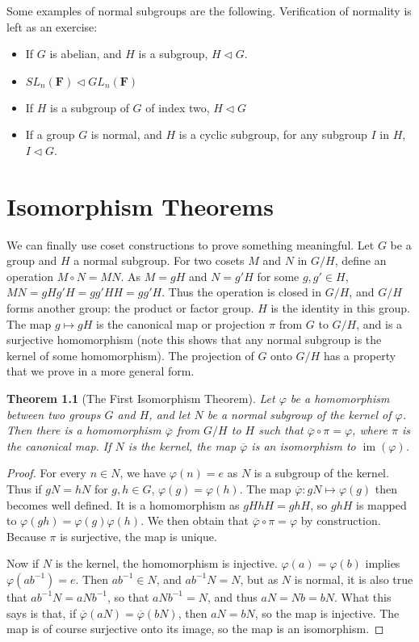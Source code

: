 \documentclass[12pt]{report}
\newtheorem{theorem}{Theorem}[section]
\DeclareMathOperator{\im}{im}
\begin{document}
Some examples of normal subgroups are the following. Verification of normality is left as an exercise:
\begin{itemize}
    \item If $G$ is abelian, and $H$ is a subgroup, $H \lhd G$.
    \item $SL_n(\mathbf{F}) \lhd GL_n(\mathbf{F})$
    \item If $H$ is a subgroup of $G$ of index two, $H \lhd G$
    \item If a group $G$ is normal, and $H$ is a cyclic subgroup, for any subgroup $I$ in $H$, $I \lhd G$.
\end{itemize}

\chapter{Isomorphism Theorems}

We can finally use coset constructions to prove something meaningful. Let $G$ be a group and $H$ a normal subgroup. For two cosets $M$ and $N$ in $G/H$, define an operation $M \circ N = MN$. As $M = gH$ and $N = g'H$ for some $g,g' \in H$, $MN = gHg'H = gg'HH = gg'H$. Thus the operation is closed in $G/H$, and $G/H$ forms another group: the product or factor group. $H$ is the identity in this group. The map $g \mapsto gH$ is the canonical map or projection $\pi$ from $G$ to $G/H$, and is a surjective homomorphism (note this shows that any normal subgroup is the kernel of some homomorphism). The projection of $G$ onto $G/H$ has a property that we prove in a more general form.

\begin{theorem}[The First Isomorphism Theorem]
Let $\varphi$ be a homomorphism between two groups $G$ and $H$, and let $N$ be a normal subgroup of the kernel of $\varphi$. Then there is a homomorphism $\overline{\varphi}$ from $G/H$ to $H$ such that $\overline{\varphi} \circ \pi = \varphi$, where $\pi$ is the canonical map. If $N$ is the kernel, the map $\overline{\varphi}$ is an isomorphism to $\im(\varphi)$.
\end{theorem}
\begin{proof}
    For every $n \in N$, we have $\varphi(n) = e$ as $N$ is a subgroup of the kernel. Thus if $gN = hN$ for $g,h \in G$, $\varphi(g) = \varphi(h)$. The map $\overline{\varphi}: gN \mapsto \varphi(g)$ then becomes well defined. It is a homomorphism as $gHhH = ghH$, so $ghH$ is mapped to $\varphi(gh) = \varphi(g)\varphi(h)$. We then obtain that $\overline{\varphi} \circ \pi = \varphi$ by construction. Because $\pi$ is surjective, the map is unique.

    Now if $N$ is the kernel, the homomorphism is injective. $\varphi(a) = \varphi(b)$ implies $\varphi(ab^{-1}) = e$. Then $ab^{-1} \in N$, and $ab^{-1}N = N$, but as $N$ is normal, it is also true that $ab^{-1}N = aNb^{-1}$, so that $aNb^{-1} = N$, and thus $aN = Nb = bN$. What this says is that, if $\overline{\varphi}(aN) = \overline{\varphi}(bN)$, then $aN = bN$, so the map is injective. The map is of course surjective onto its image, so the map is an isomorphism.
\end{proof}
\end{document}
